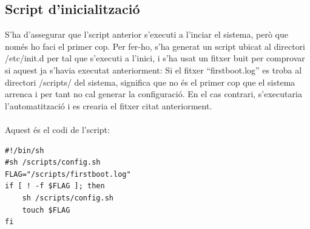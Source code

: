 \documentclass[11pt]{article}
\begin{document}
\subsection{Script d’inicialització}
S’ha d’assegurar que l’script anterior s’executi a l’inciar el sistema, però que només ho faci el primer cop. Per fer-ho, s’ha generat un script ubicat al directori /etc/init.d per tal que s’executi a l’inici, i s’ha usat un fitxer buit per comprovar si aquest ja s’havia executat anteriorment: Si el fitxer “firstboot.log” es troba al directori /scripts/ del sistema, significa que no és el primer cop que el sistema arrenca i per tant no cal generar la configuració. En el cas contrari, s’executaria l’automatització i es crearia el fitxer citat anteriorment.\\
\\
Aquest és el codi de l’script:\\
\lstset{language=sh, caption=Script per executar l'automatització només una vegada}
\begin{lstlisting}[frame=single]
#!/bin/sh
#sh /scripts/config.sh
FLAG="/scripts/firstboot.log"
if [ ! -f $FLAG ]; then
    sh /scripts/config.sh
    touch $FLAG
fi
\end{lstlisting}
\end{document}
